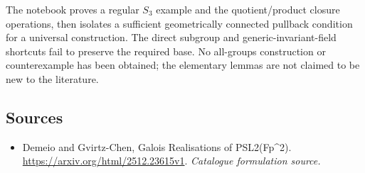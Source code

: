 \documentclass[11pt,a4paper]{article}
\numberwithin{equation}{section}
\begin{document}
The notebook proves a regular $S_3$ example and the quotient/product
closure operations, then isolates a sufficient geometrically connected
pullback condition for a universal construction.  The direct subgroup
and generic-invariant-field shortcuts fail to preserve the required
base.  No all-groups construction or counterexample has been obtained;
the elementary lemmas are not claimed to be new to the literature.
\subsection{Sources}
\begin{itemize}\raggedright
\item[\textnormal{[S1]}]\hypertarget{source:30006738:1}{} Demeio and Gvirtz-Chen, Galois Realisations of PSL2(Fp\textasciicircum{}2).
\url{https://arxiv.org/html/2512.23615v1}.
{\small\textit{Catalogue formulation source.}}
\end{itemize}
\end{document}
